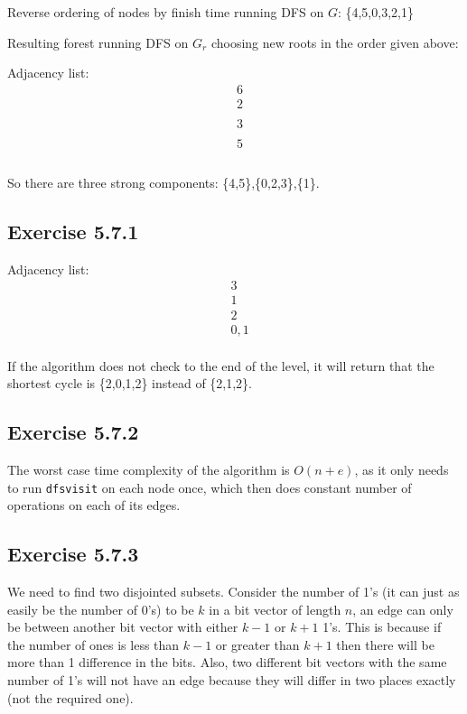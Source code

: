 \documentclass{article}
\begin{document}
Reverse ordering of nodes by finish time running DFS on \(G\): \{4,5,0,3,2,1\}

Resulting forest running DFS on \(G_r\) choosing new roots in the order given above:

Adjacency list:
\begin{align*}
&6 \\
&2 \\
& \\
&3 \\
& \\
&5 \\
& \\
\end{align*}

So there are three strong components: \{4,5\},\{0,2,3\},\{1\}.


\subsection*{Exercise 5.7.1}

Adjacency list:
\begin{align*}
&3 \\
&1 \\
&2 \\
& 0,1 \\
\end{align*}

If the algorithm does not check to the end of the level, it will return that the shortest cycle is \{2,0,1,2\} instead of \{2,1,2\}.


\subsection*{Exercise 5.7.2}

The worst case time complexity of the algorithm is \(O(n+e)\), as it only needs to run \texttt{dfsvisit} on each node once, which then does constant number of operations on each of its edges. 


\subsection*{Exercise 5.7.3}

We need to find two disjointed subsets. Consider the number of 1's (it can just as easily be the number of 0's) to be \(k\) in a bit vector of length \(n\), an edge can only be between another bit vector with either \(k-1\) or \(k+1\) 1's. This is because if the number of ones is less than \(k-1\) or greater than \(k+1\) then there will be more than 1 difference in the bits. Also, two different bit vectors with the same number of 1's will not have an edge because they will differ in two places exactly (not the required one).
\end{document}
